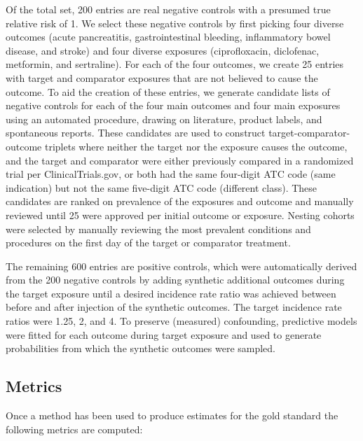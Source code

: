 \documentclass[]{article}
\begin{document}
Of the total set, 200 entries are real negative controls with a presumed
true relative risk of 1. We select these negative controls by first
picking four diverse outcomes (acute pancreatitis, gastrointestinal
bleeding, inflammatory bowel disease, and stroke) and four diverse
exposures (ciprofloxacin, diclofenac, metformin, and sertraline). For
each of the four outcomes, we create 25 entries with target and
comparator exposures that are not believed to cause the outcome. To aid
the creation of these entries, we generate candidate lists of negative
controls for each of the four main outcomes and four main exposures
using an automated procedure, drawing on literature, product labels, and
spontaneous reports. These candidates are used to construct
target-comparator-outcome triplets where neither the target nor the
exposure causes the outcome, and the target and comparator were either
previously compared in a randomized trial per ClinicalTrials.gov, or
both had the same four-digit ATC code (same indication) but not the same
five-digit ATC code (different class). These candidates are ranked on
prevalence of the exposures and outcome and manually reviewed until 25
were approved per initial outcome or exposure. Nesting cohorts were
selected by manually reviewing the most prevalent conditions and
procedures on the first day of the target or comparator treatment.

The remaining 600 entries are positive controls, which were
automatically derived from the 200 negative controls by adding synthetic
additional outcomes during the target exposure until a desired incidence
rate ratio was achieved between before and after injection of the
synthetic outcomes. The target incidence rate ratios were 1.25, 2, and
4. To preserve (measured) confounding, predictive models were fitted for
each outcome during target exposure and used to generate probabilities
from which the synthetic outcomes were sampled.

\hypertarget{metrics}{%
\subsection{Metrics}\label{metrics}}

Once a method has been used to produce estimates for the gold standard
the following metrics are computed:
\end{document}
